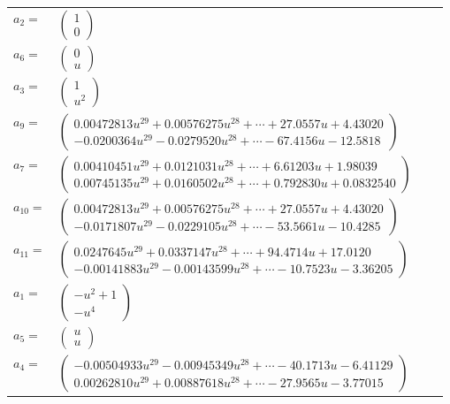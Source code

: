 \documentclass[1p]{elsarticle_modified}
\theoremstyle{definition}
\begin{document}
\begin{tabular}{m{7pt} m{180pt} m{7pt} m{180pt} }
\flushright $a_{2}=$&$\begin{pmatrix}1\\0\end{pmatrix}$ \\
\flushright $a_{6}=$&$\begin{pmatrix}0\\u\end{pmatrix}$ \\
\flushright $a_{3}=$&$\begin{pmatrix}1\\u^2\end{pmatrix}$ \\
\flushright $a_{9}=$&$\begin{pmatrix}0.00472813 u^{29}+0.00576275 u^{28}+\cdots+27.0557 u+4.43020\\-0.0200364 u^{29}-0.0279520 u^{28}+\cdots-67.4156 u-12.5818\end{pmatrix}$ \\
\flushright $a_{7}=$&$\begin{pmatrix}0.00410451 u^{29}+0.0121031 u^{28}+\cdots+6.61203 u+1.98039\\0.00745135 u^{29}+0.0160502 u^{28}+\cdots+0.792830 u+0.0832540\end{pmatrix}$ \\
\flushright $a_{10}=$&$\begin{pmatrix}0.00472813 u^{29}+0.00576275 u^{28}+\cdots+27.0557 u+4.43020\\-0.0171807 u^{29}-0.0229105 u^{28}+\cdots-53.5661 u-10.4285\end{pmatrix}$ \\
\flushright $a_{11}=$&$\begin{pmatrix}0.0247645 u^{29}+0.0337147 u^{28}+\cdots+94.4714 u+17.0120\\-0.00141883 u^{29}-0.00143599 u^{28}+\cdots-10.7523 u-3.36205\end{pmatrix}$ \\
\flushright $a_{1}=$&$\begin{pmatrix}- u^2+1\\- u^4\end{pmatrix}$ \\
\flushright $a_{5}=$&$\begin{pmatrix}u\\u\end{pmatrix}$ \\
\flushright $a_{4}=$&$\begin{pmatrix}-0.00504933 u^{29}-0.00945349 u^{28}+\cdots-40.1713 u-6.41129\\0.00262810 u^{29}+0.00887618 u^{28}+\cdots-27.9565 u-3.77015\end{pmatrix}$ \\

\end{tabular}
\end{document}
